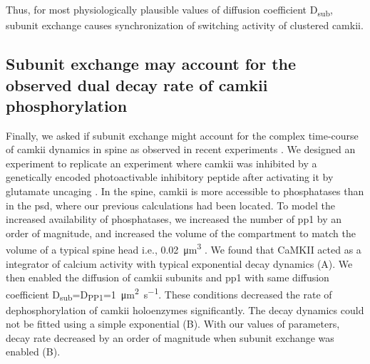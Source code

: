 \documentclass[9pt,lineno,doublespacing]{elife}
\newcommand\SUB[2]{#1\textsubscript{#2}}
\begin{document}
Thus, for most physiologically plausible values of diffusion coefficient
\SUB{D}{sub}, subunit exchange causes synchronization of switching activity of
clustered \gls{camkii}.

\subsection{Subunit exchange may account for the observed dual decay rate of
\gls{camkii} phosphorylation}\label{subsec:camkii_decay_two_time_course}

Finally, we asked if subunit exchange might account for the complex time-course
of \gls{camkii} dynamics in spine as observed in recent experiments
\citep{chang_camkii_2017}. We designed an experiment to replicate an experiment
where \gls{camkii} was inhibited by a genetically encoded photoactivable
inhibitory peptide after activating it by glutamate uncaging
\citep{murakoshi_kinetics_2017}. In the spine, \gls{camkii} is more accessible to
phosphatases than in the \gls{psd}, where our previous calculations had been
located. To model the increased availability of phosphatases, we increased the
number of \gls{pp1} by an order of magnitude, and increased the volume of the
compartment to match the volume of a typical spine head i.e.,
\SI{0.02}{\cubic\micro\meter} \citep{bartol_nanoconnectomic_2015}. We found that
CaMKII acted as a integrator of calcium activity with typical exponential decay
dynamics (A). We then enabled the diffusion of
\gls{camkii} subunits and \gls{pp1} with same diffusion coefficient
\SUB{D}{sub}=\SUB{D}{PP1}=\SI{1}{\micro\meter\squared\per\second}.  These
conditions decreased the rate of dephosphorylation of \gls{camkii} holoenzymes
significantly. The decay dynamics could not be fitted using a simple exponential
(B). With our values of parameters, decay rate
decreased by an order of magnitude when subunit exchange was enabled
(B).
\end{document}
